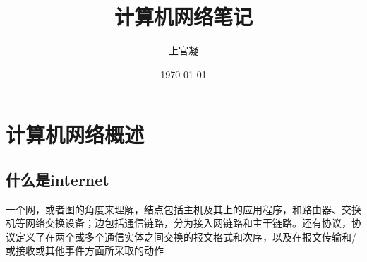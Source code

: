 \documentclass[]{report}
\title{{\huge {计算机网络笔记}}}
\author{上官凝}
\date{\today}
\begin{document}
\theoremstyle{definition} \newtheorem{theorem}{Thm}[section] %
\theoremstyle{definition} \newtheorem{definition}{Def}[section] %
\theoremstyle{plain} \newtheorem{lemma}{lemma}[section] %

	\maketitle
	\newpage

	\tableofcontents
	\newpage


	\chapter{计算机网络概述}
	\section{什么是internet}
		一个网，或者图的角度来理解，结点包括主机及其上的应用程序，和路由器、交换机等网络交换设备；边包括通信链路，分为接入网链路和主干链路。还有协议，协议定义了在两个或多个通信实体之间交换的报文格式和次序，以及在报文传输和/或接收或其他事件方面所采取的动作
\end{document}
